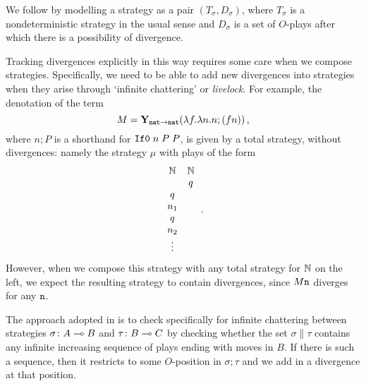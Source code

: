 \documentclass[sigplan,10pt,review]{acmart}\settopmatter{printfolios=true,printccs=false,printacmref=false}
\begin{document}
We follow \cite{mcCHFiniteND} by modelling a strategy as a pair $(T_\sigma,D_\sigma)$, where $T_\sigma$ is a nondeterministic strategy in the usual sense and $D_\sigma$ is a set of $O$-plays after which there is a possibility of divergence.  

Tracking divergences explicitly in this way requires some care when we compose strategies.  
Specifically, we need to be able to add new divergences into strategies when they arise through `infinite chattering' or \emph{livelock}.  
For example, the denotation of the term
\[
  M = \mathbf{Y}_{{\mathtt{nat}}\to{\mathtt{nat}}}(\lambda f.\lambda n.n;(f n))\,,
  \]
where $n;P$ is a shorthand for ${\mathtt{If0}\;} n\;P\;P$, is given by a total strategy, without divergences: namely the strategy $\mu$ with plays of the form
\[
  \begin{array}{cc}
    \mathbf{\mathbb{N}} & \mathbf{\mathbb{N}} \\
    & q \\
    q & \\
    n_1 & \\
    q & \\
    n_2 & \\
    \vdots &
  \end{array}\,.
  \]
However, when we compose this strategy with any total strategy for $\mathbb{N}$ on the left, we expect the resulting strategy to contain divergences, since $M {\mathtt{n}}$ diverges for any ${\mathtt{n}}$.

The approach adopted in \cite{mcCHFiniteND} is to check specifically for infinite chattering between strategies $\sigma\colon A\multimap B$ and $\tau\colon B\multimap C$ by checking whether the set $\sigma\|\tau$ contains any infinite increasing sequence of plays ending with moves in $B$.  
If there is such a sequence, then it restricts to some $O$-position in $\sigma;\tau$ and we add in a divergence at that position.  
\end{document}
